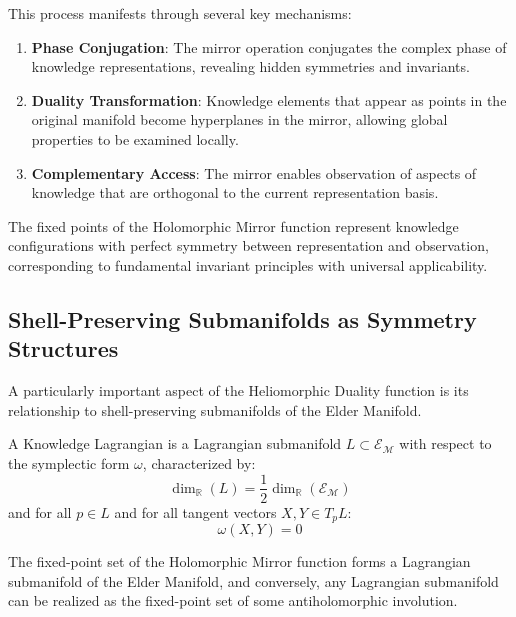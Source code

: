 This process manifests through several key mechanisms:

\begin{enumerate}
\item \textbf{Phase Conjugation}: The mirror operation conjugates the complex phase of knowledge representations, revealing hidden symmetries and invariants.
\item \textbf{Duality Transformation}: Knowledge elements that appear as points in the original manifold become hyperplanes in the mirror, allowing global properties to be examined locally.
\item \textbf{Complementary Access}: The mirror enables observation of aspects of knowledge that are orthogonal to the current representation basis.
\end{enumerate}

\begin{proposition}
The fixed points of the Holomorphic Mirror function represent knowledge configurations with perfect symmetry between representation and observation, corresponding to fundamental invariant principles with universal applicability.
\end{proposition}

\subsection{Shell-Preserving Submanifolds as Symmetry Structures}

A particularly important aspect of the Heliomorphic Duality function is its relationship to shell-preserving submanifolds of the Elder Manifold.

\begin{definition}
A Knowledge Lagrangian is a Lagrangian submanifold $L \subset \mathcal{E}_{\mathcal{M}}$ with respect to the symplectic form $\omega$, characterized by:
\begin{equation}
\dim_{\mathbb{R}}(L) = \frac{1}{2}\dim_{\mathbb{R}}(\mathcal{E}_{\mathcal{M}})
\end{equation}
and for all $p \in L$ and for all tangent vectors $X, Y \in T_pL$:
\begin{equation}
\omega(X, Y) = 0
\end{equation}
\end{definition}

\begin{theorem}
The fixed-point set of the Holomorphic Mirror function forms a Lagrangian submanifold of the Elder Manifold, and conversely, any Lagrangian submanifold can be realized as the fixed-point set of some antiholomorphic involution.
\end{theorem}

